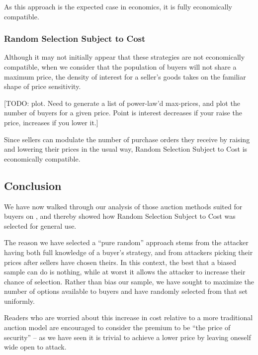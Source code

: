 As this approach is the expected case in economics, it is fully
economically compatible.

\subsubsection{Random Selection Subject to Cost}

Although it may not initially appear that these strategies are not
economically compatible, when we consider that the population of
buyers will not share a maximum price, the density of interest for a
seller's goods takes on the familiar shape of price sensitivity.

[TODO: plot. Need to generate a list of power-law'd max-prices, and
  plot the number of buyers for a given price. Point is interest
  decreases if your raise the price, increases if you lower it.]

Since sellers can modulate the number of purchase orders they receive
by raising and lowering their prices in the usual way, Random
Selection Subject to Cost is economically compatible.

\subsection{Conclusion}

We have now walked through our analysis of those auction methods
suited for buyers on \tOM{}, and thereby showed how Random Selection
Subject to Cost was selected for general use.

The reason we have selected a ``pure random'' approach stems from the
attacker having both full knowledge of a buyer's strategy, and from
attackers picking their prices after sellers have chosen theirs.  In
this context, the best that a biased sample can do is nothing, while
at worst it allows the attacker to increase their chance of
selection. Rather than bias our sample, we have sought to maximize the
number of options available to buyers and have randomly selected from
that set uniformly.

Readers who are worried about this increase in cost relative to a more
traditional auction model are encouraged to consider the premium to be
``the price of security'' -- as we have seen it is trivial to achieve
a lower price by leaving oneself wide open to attack.
